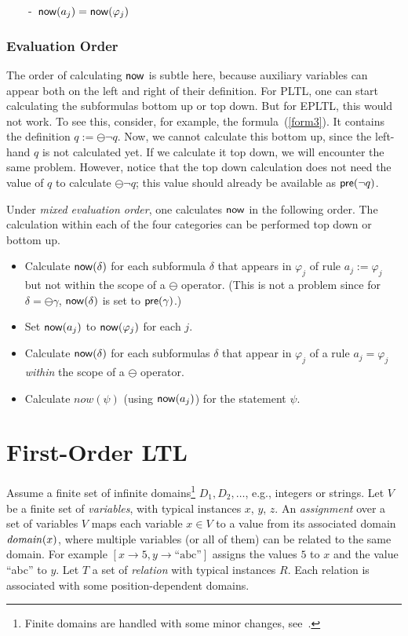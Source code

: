 \ \ \ \ -\ $\mathsf{now} ( a_j ) = \mathsf{now} ( \varphi_j )$ \\

\subsubsection{Evaluation Order} 

The order of calculating $\mathsf{now}$ is subtle here, because
auxiliary variables can appear both on the left and right of their
definition. For PLTL, one can start calculating the subformulas
bottom up or top down. But for EPLTL, this would not work. To see this, consider, for example, the formula~(\ref{form3}). It contains
the definition $q := \ominus \neg q$. Now, we cannot calculate this
bottom up, since the left-hand $q$ is not calculated yet.
If we calculate it top down, we will encounter the same problem.
However, notice that the top down calculation does not need the
value of $q$ to calculate $\ominus \neg q$; this value should already be available as $\mathsf{pre} ( \neg q )$.

Under {\em mixed evaluation order}, one calculates $\mathsf{now}$ in the following order. The calculation within each of the four categories can be performed top down or bottom up.
\begin{itemize}
\item Calculate 
$\mathsf{now} ( \delta )$ for each subformula $\delta$
that appears in $\varphi_j$ of rule
$a_j := \varphi_j$ but not within the scope of
a $\ominus$ operator. (This is not
a problem since for $\delta = \ominus \gamma$,
$\mathsf{now} ( \delta )$ is set to $\mathsf{pre} ( \gamma )$.)
\item Set 
$\mathsf{now} ( a_j )$ to $\mathsf{now} ( \varphi_j )$ for each $j$.
\item Calculate $\mathsf{now} ( \delta )$ for each subformulas $\delta$
that appear in $\varphi_j$ of a rule
$a_j = \varphi_j$ {\em  within} the scope of
a $\ominus$ operator.
\item Calculate $now ( \psi )$ (using $\mathsf{now} ( a_j )$) for
the statement $\psi$.
\end{itemize}



\section{First-Order LTL}

\label{sec:syntax-semantics}

Assume a finite set of infinite domains\footnote{Finite domains are handled with some minor changes, see~\cite{HPU}.}
$D_1, D_2, \ldots$,
e.g., integers or strings. 
Let $V$ be a finite set of {\em variables}, 
with typical instances $x$, $y$, $z$.
An {\em assignment} over a set of variables $V$
maps each variable $x \in V$ to a value from
its associated domain $\mathit{domain} ( x )$, where multiple variables (or all of them)
can be related to the same domain. For example
$[ x \rightarrow 5 , y \rightarrow \text{``abc''} ]$ assigns
the values $5$ to $x$ and the value ``abc'' to $y$.
Let $T$ a set of {\em relation} 
with typical instances $R$.
Each relation is associated with some position-dependent domains.

